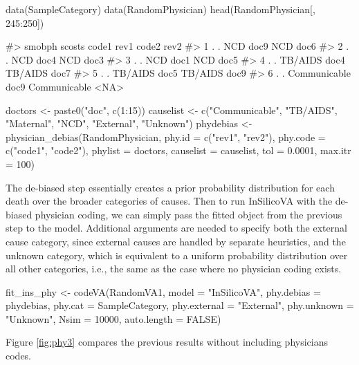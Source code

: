 \begin{Schunk}
\begin{Sinput}
data(SampleCategory)
data(RandomPhysician)
head(RandomPhysician[, 245:250])
\end{Sinput}
\begin{Soutput}
#>   smobph scosts        code1 rev1        code2 rev2
#> 1      .      .          NCD doc9          NCD doc6
#> 2      .      .          NCD doc4          NCD doc3
#> 3      .      .          NCD doc1          NCD doc5
#> 4      .      .      TB/AIDS doc4      TB/AIDS doc7
#> 5      .      .      TB/AIDS doc5      TB/AIDS doc9
#> 6      .      . Communicable doc9 Communicable <NA>
\end{Soutput}
\end{Schunk}

\begin{Schunk}
\begin{Sinput}
doctors <- paste0("doc", c(1:15))
causelist <- c("Communicable", "TB/AIDS", "Maternal",
              "NCD", "External", "Unknown")
phydebias <- physician_debias(RandomPhysician, 
          phy.id = c("rev1", "rev2"), phy.code = c("code1", "code2"), 
          phylist = doctors, causelist = causelist, tol = 0.0001, max.itr = 100)
\end{Sinput}
\end{Schunk}

The de-biased step essentially creates a prior probability distribution
for each death over the broader categories of causes. Then to run
InSilicoVA with the de-biased physician coding, we can simply pass the
fitted object from the previous step to the model. Additional arguments
are needed to specify both the external cause category, since external
causes are handled by separate heuristics, and the unknown category,
which is equivalent to a uniform probability distribution over all other
categories, i.e., the same as the case where no physician coding exists.

\begin{Schunk}
\begin{Sinput}
fit_ins_phy <- codeVA(RandomVA1, model = "InSilicoVA",
             phy.debias = phydebias, phy.cat = SampleCategory, 
             phy.external = "External", phy.unknown = "Unknown",
             Nsim = 10000, auto.length = FALSE) 
\end{Sinput}
\end{Schunk}

Figure \ref{fig:phy3} compares the previous results without including
physicians codes.

